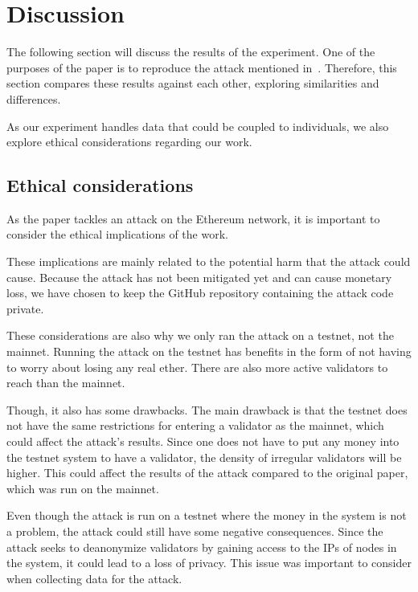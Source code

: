 

\section{Discussion}\label{sec:discussion}
The following section will discuss the results of the experiment.
One of the purposes of the paper is
to reproduce the attack mentioned in~\cite{heimbach2024deanonymizingethereumvalidatorsp2p}.
Therefore, this section compares these results against each other, exploring similarities and differences.


As our experiment handles data that could be coupled to individuals,
we also explore ethical considerations regarding our work.


\subsection{Ethical considerations}\label{subsec:ethical-considerations}
As the paper tackles an attack on the Ethereum network, it is important to consider the ethical implications of the work.

These implications are mainly related to the potential harm that the attack could cause.
Because the attack has not been mitigated yet and can cause monetary loss, we have chosen to keep the GitHub repository containing the attack code private.

These considerations are also why we only ran the attack on a testnet, not the mainnet.
Running the attack on the testnet has benefits in the form
of not having to worry about losing any real ether.
There are also more active validators to reach than the mainnet.

Though, it also has some drawbacks.
The main drawback is that the testnet does not have the same restrictions for entering a validator as the mainnet, which could affect the attack's results.
Since one does not have to put any money into the testnet system to have a validator, the density of irregular validators will be higher.
This could affect the results of the attack compared to the original paper, which was run on the mainnet.

Even though the attack is run on a testnet where the money in the system is not a problem, the attack could still have some negative consequences.
Since the attack seeks to deanonymize validators by gaining access to the IPs of nodes in the system, it could lead to a loss of privacy.
This issue was important to consider when collecting data for the attack.


